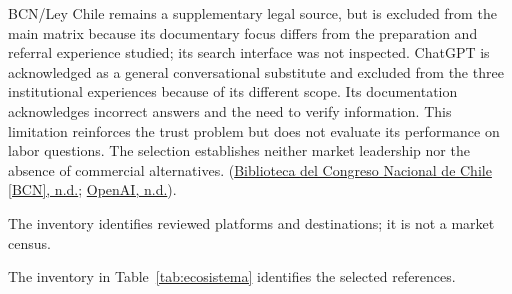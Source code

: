 BCN/Ley Chile remains a supplementary legal source, but is excluded from the main matrix because its documentary focus differs from the preparation and referral experience studied; its search interface was not inspected. ChatGPT is acknowledged as a general conversational substitute and excluded from the three institutional experiences because of its different scope. Its documentation acknowledges incorrect answers and the need to verify information. This limitation reinforces the trust problem but does not evaluate its performance on labor questions. The selection establishes neither market leadership nor the absence of commercial alternatives. (\hyperref[ref:bcn]{Biblioteca del Congreso Nacional de Chile [BCN], n.d.}; \hyperref[ref:openai]{OpenAI, n.d.}).


The inventory identifies reviewed platforms and destinations; it is not a market census.


The inventory in Table~\ref{tab:ecosistema} identifies the selected references.


